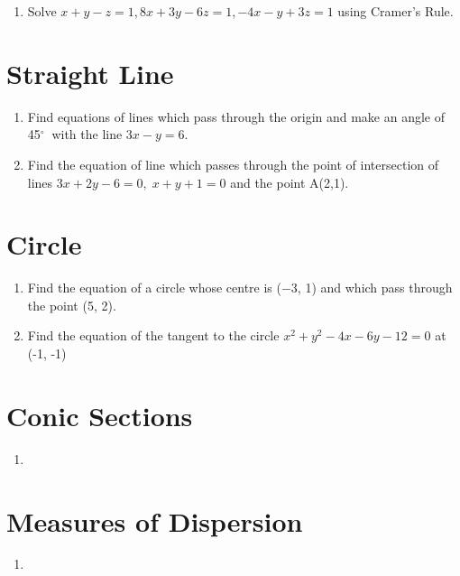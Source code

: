 \documentclass[17pt]{extarticle}
\newcommand{\degree}{$^{\circ}\ $} %
\begin{document}
\begin{multicols}{2}
\begin{enumerate}
\item Solve $x +y - z = 1,  8x +3y - 6z = 1, -4x - y + 3z = 1$ using Cramer's Rule.
\end{enumerate} 

\section{Straight Line}
\noindent
\begin{enumerate}
\item Find equations of lines which pass
through the origin and make an angle of 45\degree
with the line $3x - y = 6.$

\item Find the equation of line which passes
	 through the point of intersection of lines
	 $3 x + 2 y - 6 = 0 ,\; x + y + 1 = 0$ and the point A(2,1).

\end{enumerate} 

\section{Circle}
\noindent
\begin{enumerate}

\item Find the equation of a circle whose centre is
(−3, 1) and which pass through the point (5, 2).

\item Find the equation of the tangent to the circle $x^2 + y^2 - 4x - 6y - 12 = 0$ at (-1, -1)

\end{enumerate} 

\section{Conic Sections}
\noindent
\begin{enumerate}
\item

\end{enumerate} 

\section{Measures of Dispersion}
\noindent
\begin{enumerate}
\item 


\end{enumerate}
\end{multicols}
\end{document}
